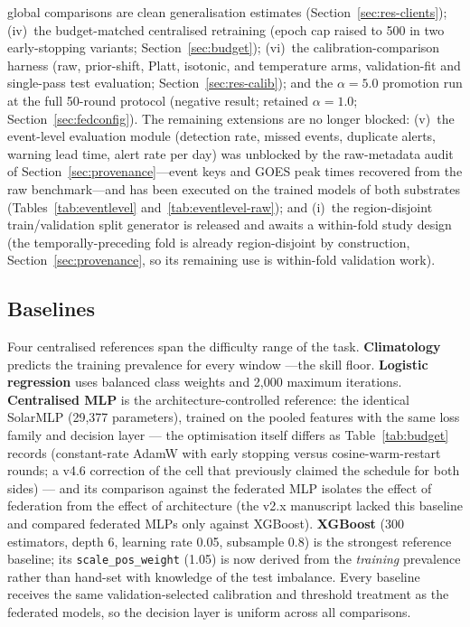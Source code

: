 \begin{itemize}[leftmargin=1.4em,itemsep=1pt]
global comparisons are clean generalisation estimates
(Section~\ref{sec:res-clients}); (iv)\ the budget-matched centralised
retraining (epoch cap raised to 500 in two early-stopping variants;
Section~\ref{sec:budget}); (vi)\ the calibration-comparison harness
(raw, prior-shift, Platt, isotonic, and temperature arms,
validation-fit and single-pass test evaluation;
Section~\ref{sec:res-calib}); and the $\alpha{=}5.0$ promotion run at
the full 50-round protocol (negative result; retained
$\alpha{=}1.0$; Section~\ref{sec:fedconfig}). The remaining
extensions are no longer blocked: (v)\ the event-level evaluation
module (detection rate, missed events, duplicate alerts, warning lead
time, alert rate per day) was unblocked by the raw-metadata audit of
Section~\ref{sec:provenance}---event keys and GOES peak times
recovered from the raw benchmark---and has been executed on the
trained models of both substrates
(Tables~\ref{tab:eventlevel} and~\ref{tab:eventlevel-raw}); and
(i)\ the region-disjoint train/validation split generator is released
and awaits a within-fold study design (the temporally-preceding fold
is already region-disjoint by construction,
Section~\ref{sec:provenance}, so its remaining use is
within-fold validation work).
\end{itemize}

\subsection{Baselines}

Four centralised references span the difficulty range of the task.
\textbf{Climatology} predicts the training prevalence for every window
---the skill floor. \textbf{Logistic regression} uses balanced class
weights and 2{,}000 maximum iterations. \textbf{Centralised MLP} is the
architecture-controlled reference: the identical SolarMLP
(29{,}377 parameters), trained on the pooled features with the same
loss family and decision layer — the optimisation itself differs as
Table~\ref{tab:budget} records (constant-rate AdamW with early
stopping versus cosine-warm-restart rounds; a v4.6 correction of the
cell that previously claimed the schedule for both sides) — and its
comparison against the federated MLP isolates the
effect of federation from the effect of architecture (the v2.x
manuscript lacked this baseline and compared federated MLPs only
against XGBoost). \textbf{XGBoost} \cite{chen2016} (300 estimators,
depth 6, learning rate 0.05, subsample 0.8) is the strongest reference
baseline; its \texttt{scale\_pos\_weight} (1.05) is now derived from
the \emph{training} prevalence rather than hand-set with knowledge of
the test imbalance. Every baseline receives the same
validation-selected calibration and threshold treatment as the
federated models, so the decision layer is uniform across all
comparisons.

